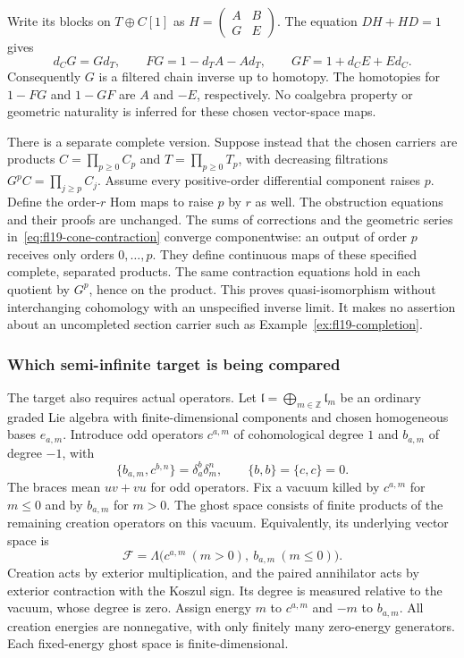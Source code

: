 Write its blocks on $T\oplus C[1]$ as
$H=\left(\begin{smallmatrix}A&B\\G&E\end{smallmatrix}\right)$.
The equation $DH+HD=1$ gives
\[
d_CG=Gd_T,\qquad
FG=1-d_TA-Ad_T,\qquad
GF=1+d_CE+Ed_C.
\]
Consequently $G$ is a filtered chain inverse up to homotopy.
The homotopies for $1-FG$ and $1-GF$ are $A$ and $-E$, respectively.
No coalgebra property or geometric naturality is inferred for these chosen vector-space maps.

There is a separate complete version.
Suppose instead that the chosen carriers are products
$C=\prod_{p\ge0}C_p$ and $T=\prod_{p\ge0}T_p$, with decreasing filtrations
$G^pC=\prod_{j\ge p}C_j$.
Assume every positive-order differential component raises $p$.
Define the order-$r$ Hom maps to raise $p$ by $r$ as well.
The obstruction equations and their proofs are unchanged.
The sums of corrections and the geometric series in~\eqref{eq:fl19-cone-contraction} converge componentwise: an output of order $p$ receives only orders $0,\ldots,p$.
They define continuous maps of these specified complete, separated products.
The same contraction equations hold in each quotient by $G^p$, hence on the product.
This proves quasi-isomorphism without interchanging cohomology with an unspecified inverse limit.
It makes no assertion about an uncompleted section carrier such as Example~\ref{ex:fl19-completion}.

\subsubsection{Which semi-infinite target is being compared}

The target also requires actual operators.
Let $\mathfrak l=\bigoplus_{m\in\mathbb Z}\mathfrak l_m$ be an ordinary graded Lie algebra with finite-dimensional components and chosen homogeneous bases $e_{a,m}$.
Introduce odd operators $c^{a,m}$ of cohomological degree $1$ and $b_{a,m}$ of degree $-1$, with
\[
\{b_{a,m},c^{b,n}\}=\delta_a^b\delta_m^n,
\qquad \{b,b\}=\{c,c\}=0.
\]
The braces mean $uv+vu$ for odd operators.
Fix a vacuum killed by $c^{a,m}$ for $m\le0$ and by $b_{a,m}$ for $m>0$.
The ghost space consists of finite products of the remaining creation operators on this vacuum.
Equivalently, its underlying vector space is
\[
\mathcal F=\Lambda\bigl(c^{a,m}\ (m>0),\ b_{a,m}\ (m\le0)\bigr).
\]
Creation acts by exterior multiplication, and the paired annihilator acts by exterior contraction with the Koszul sign.
Its degree is measured relative to the vacuum, whose degree is zero.
Assign energy $m$ to $c^{a,m}$ and $-m$ to $b_{a,m}$.
All creation energies are nonnegative, with only finitely many zero-energy generators.
Each fixed-energy ghost space is finite-dimensional.

